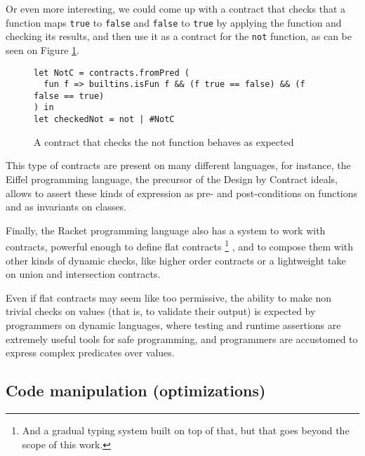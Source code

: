 \documentclass[sigplan,10pt,review,anonymous]{acmart}
\newcommand{\info}[2][1=]{}
\newcommand{\resolved}[2]{}
\newcommand{\nickel}[1]{\lstinline[language=nickel]{#1}}
\begin{document}
Or even more interesting, we could come up with a contract that checks that a function
maps \nickel{true} to \nickel{false} and \nickel{false} to \nickel{true}
by applying the function and checking its results,
and then use it as a contract for the \nickel{not} function, as can be seen on Figure
\ref{fig:checked-not}.

\begin{figure}[h]
  \begin{center}
\begin{lstlisting}[language=nickel]
let NotC = contracts.fromPred (
  fun f => builtins.isFun f && (f true == false) && (f false == true)
) in
let checkedNot = not | #NotC
\end{lstlisting}
\end{center}
\caption{A contract that checks the not function behaves as expected}
\label{fig:checked-not}
\end{figure}

This type of contracts are present on many different languages,
for instance, the Eiffel programming language\cite{meyer1987eiffel}, the precursor
of the Design by Contract ideals, allows to assert
these kinds of expression as pre- and post-conditions on
functions and as invariants on classes\cite{EiffelDesignByContract}.
\resolved{I (Arnaud) believe Eiffel has this feature as well,
  doesn't it? (Teo) You're right},


Finally, the Racket programming language also has a system to work with
contracts, powerful enough to define flat contracts
\footnote{And a gradual typing system
built on top of that, but that goes beyond the scope of this
work.}
, and
to compose them with other kinds of dynamic checks,
like higher order contracts or a lightweight take on union
and intersection contracts\cite{RacketContracts}.

Even if flat contracts may seem like too permissive, the ability to make
non trivial checks on values (that is, to validate their output) is expected
by programmers on dynamic languages, where testing and runtime
assertions are extremely useful tools for safe programming, and
programmers are accustomed to express complex predicates
over values.


\subsection*{Code manipulation (optimizations)}
\label{sec:optimizations}
\info{Present inlining and CSE as two major code
optimizations.
Purity and immutability as two important factors.}
\end{document}
